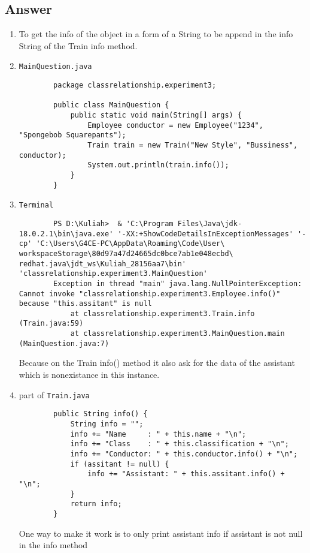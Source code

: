 \documentclass[12pt,titlepage]{article}
\begin{document}
\subsection{Answer}
\begin{enumerate}
    \item To get the info of the object in a form of a String to be append in the info String of the Train info method.
    \item \texttt{MainQuestion.java}
    \begin{verbatim}
        package classrelationship.experiment3;

        public class MainQuestion {
            public static void main(String[] args) {
                Employee conductor = new Employee("1234", "Spongebob Squarepants");
                Train train = new Train("New Style", "Bussiness", conductor);
                System.out.println(train.info());
            }
        }
    \end{verbatim}
    \item \texttt{Terminal}
    \begin{verbatim}
        PS D:\Kuliah>  & 'C:\Program Files\Java\jdk-18.0.2.1\bin\java.exe' '-XX:+ShowCodeDetailsInExceptionMessages' '-cp' 'C:\Users\G4CE-PC\AppData\Roaming\Code\User\ workspaceStorage\80d97a47d24665dc0bce7ab1e048ecbd\ redhat.java\jdt_ws\Kuliah_28156aa7\bin' 'classrelationship.experiment3.MainQuestion'
        Exception in thread "main" java.lang.NullPointerException: Cannot invoke "classrelationship.experiment3.Employee.info()" because "this.assitant" is null
            at classrelationship.experiment3.Train.info (Train.java:59)
            at classrelationship.experiment3.MainQuestion.main (MainQuestion.java:7) 
    \end{verbatim}
    Because on the Train info() method it also ask for the data of the assistant which is nonexistance in this instance.
    \item part of \texttt{Train.java}
    \begin{verbatim}
        public String info() {
            String info = "";
            info += "Name     : " + this.name + "\n";
            info += "Class    : " + this.classification + "\n";
            info += "Conductor: " + this.conductor.info() + "\n";
            if (assitant != null) {
                info += "Assistant: " + this.assitant.info() + "\n";
            }
            return info;
        }
    \end{verbatim}
    One way to make it work is to only print assistant info if assistant is not null in the info method
\end{enumerate}
\end{document}
